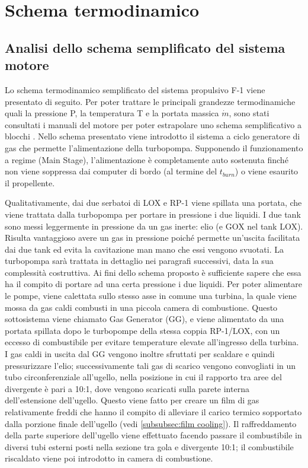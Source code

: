 \section{Schema termodinamico}
\label{sec:schema termodinamico}

\subsection{Analisi dello schema semplificato del sistema motore}
\label{subsec:schema semplificato}

Lo schema termodinamico semplificato del sistema propulsivo F-1 viene presentato di seguito. Per poter trattare le principali grandezze termodinamiche quali la pressione P, la temperatura T e la portata massica $ \dot{m} $, sono stati consultati i manuali del motore per poter estrapolare uno schema semplificativo a blocchi \cite{engine_manual}.
Nello schema presentato viene introdotto il sistema a ciclo generatore di gas che permette l’alimentazione della turbopompa. Supponendo il funzionamento a regime (Main Stage), l’alimentazione è completamente auto sostenuta finché non viene soppressa dai computer di bordo (al termine del $ t_{burn} $) o viene esaurito il propellente.

Qualitativamente, dai due serbatoi di LOX e RP-1 viene spillata una portata, che viene trattata dalla turbopompa per portare in pressione i due liquidi. I due tank sono messi leggermente in pressione da un gas inerte: elio (e GOX nel tank LOX).
Risulta vantaggioso avere un gas in pressione poiché permette un'uscita facilitata dai due tank ed evita la cavitazione man mano che essi vengono svuotati. La turbopompa sarà trattata in dettaglio nei paragrafi successivi, data la sua complessità costruttiva.
Ai fini dello schema proposto è sufficiente sapere che essa ha il compito di portare ad una certa pressione i due liquidi. Per poter alimentare le pompe, viene calettata sullo stesso asse in comune una turbina, la quale viene mossa da gas caldi combusti in una piccola camera di combustione.
Questo sottosistema viene chiamato Gas Generator (GG), e viene alimentato da una portata spillata dopo le turbopompe della stessa coppia RP-1/LOX, con un eccesso di combustibile per evitare temperature elevate all'ingresso della turbina.
I gas caldi in uscita dal GG vengono inoltre sfruttati per scaldare e quindi pressurizzare l’elio; successivamente tali gas di scarico vengono convogliati in un tubo circonferenziale all’ugello, nella posizione in cui il rapporto tra aree del divergente è pari a 10:1, dove vengono scaricati sulla parete interna dell’estensione dell’ugello.
Questo viene fatto per creare un film di gas relativamente freddi che hanno il compito di alleviare il carico termico sopportato dalla porzione finale dell'ugello (vedi \autoref{subsubsec:film cooling}).
Il raffreddamento della parte superiore dell’ugello viene effettuato facendo passare il combustibile in diversi tubi esterni posti nella sezione tra gola e divergente 10:1; il combustibile riscaldato viene poi introdotto in camera di combustione.

